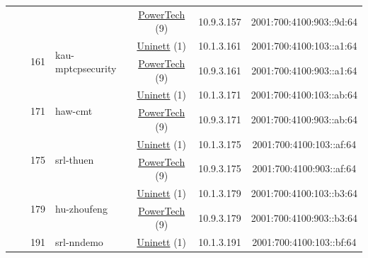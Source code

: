 \begin{small}
\begin{center}
\begin{longtable}{|c|c|c|c|c|c|c|c|}
  &  &  &  & \multicolumn{2}{|c|}{\tiny{\href{http://www.powertech.no}{PowerTech} (9)}} & \tiny{10.9.3.157} & \tiny{2001:700:4100:903::9d:64} \\* \cline{3-3}\cline{4-4}\cline{5-5}\cline{6-6}\cline{7-7}\cline{8-8}
  &  & \multirow{2}{*}{\tiny{161}} & \multicolumn{1}{|l|}{\multirow{2}{*}{\tiny{kau-mptcpsecurity}}} & \multicolumn{2}{|c|}{\tiny{\href{https://www.uninett.no}{Uninett} (1)}} & \tiny{10.1.3.161} & \tiny{2001:700:4100:103::a1:64} \\* \cline{5-5}\cline{6-6}\cline{7-7}\cline{8-8}
  &  &  &  & \multicolumn{2}{|c|}{\tiny{\href{http://www.powertech.no}{PowerTech} (9)}} & \tiny{10.9.3.161} & \tiny{2001:700:4100:903::a1:64} \\* \cline{3-3}\cline{4-4}\cline{5-5}\cline{6-6}\cline{7-7}\cline{8-8}
  &  & \multirow{2}{*}{\tiny{171}} & \multicolumn{1}{|l|}{\multirow{2}{*}{\tiny{haw-cmt}}} & \multicolumn{2}{|c|}{\tiny{\href{https://www.uninett.no}{Uninett} (1)}} & \tiny{10.1.3.171} & \tiny{2001:700:4100:103::ab:64} \\* \cline{5-5}\cline{6-6}\cline{7-7}\cline{8-8}
  &  &  &  & \multicolumn{2}{|c|}{\tiny{\href{http://www.powertech.no}{PowerTech} (9)}} & \tiny{10.9.3.171} & \tiny{2001:700:4100:903::ab:64} \\* \cline{3-3}\cline{4-4}\cline{5-5}\cline{6-6}\cline{7-7}\cline{8-8}
  &  & \multirow{2}{*}{\tiny{175}} & \multicolumn{1}{|l|}{\multirow{2}{*}{\tiny{srl-thuen}}} & \multicolumn{2}{|c|}{\tiny{\href{https://www.uninett.no}{Uninett} (1)}} & \tiny{10.1.3.175} & \tiny{2001:700:4100:103::af:64} \\* \cline{5-5}\cline{6-6}\cline{7-7}\cline{8-8}
  &  &  &  & \multicolumn{2}{|c|}{\tiny{\href{http://www.powertech.no}{PowerTech} (9)}} & \tiny{10.9.3.175} & \tiny{2001:700:4100:903::af:64} \\* \cline{3-3}\cline{4-4}\cline{5-5}\cline{6-6}\cline{7-7}\cline{8-8}
  &  & \multirow{2}{*}{\tiny{179}} & \multicolumn{1}{|l|}{\multirow{2}{*}{\tiny{hu-zhoufeng}}} & \multicolumn{2}{|c|}{\tiny{\href{https://www.uninett.no}{Uninett} (1)}} & \tiny{10.1.3.179} & \tiny{2001:700:4100:103::b3:64} \\* \cline{5-5}\cline{6-6}\cline{7-7}\cline{8-8}
  &  &  &  & \multicolumn{2}{|c|}{\tiny{\href{http://www.powertech.no}{PowerTech} (9)}} & \tiny{10.9.3.179} & \tiny{2001:700:4100:903::b3:64} \\* \cline{3-3}\cline{4-4}\cline{5-5}\cline{6-6}\cline{7-7}\cline{8-8}
  &  & \multirow{2}{*}{\tiny{191}} & \multicolumn{1}{|l|}{\multirow{2}{*}{\tiny{srl-nndemo}}} & \multicolumn{2}{|c|}{\tiny{\href{https://www.uninett.no}{Uninett} (1)}} & \tiny{10.1.3.191} & \tiny{2001:700:4100:103::bf:64} \\* \cline{5-5}\cline{6-6}\cline{7-7}\cline{8-8}

\end{longtable}
\end{center}
\end{small}
